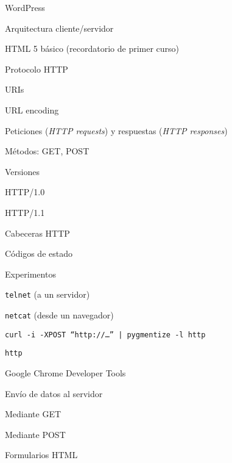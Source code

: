 \begin{longenum}
\begin{longenum}
\begin{longenum}
\begin{longenum}
\begin{longenum}
                    \item WordPress
                \end{longenum}
            \end{longenum}
        \end{longenum}
        \item Arquitectura cliente/servidor
        \item HTML 5 básico (recordatorio de primer curso)
        \item Protocolo HTTP
        \begin{longenum}
            \item URIs
            \begin{longenum}
                \item URL encoding
            \end{longenum}
            \item Peticiones (\textit{HTTP requests}) y respuestas (\textit{HTTP responses})
            \item Métodos: GET, POST
            \item Versiones 
            \begin{longenum}
                \item HTTP/1.0
                \item HTTP/1.1
            \end{longenum}
            \item Cabeceras HTTP
            \item Códigos de estado
            \item Experimentos
            \begin{longenum}
                \item \texttt{telnet} (a un servidor)
                \item \texttt{netcat} (desde un navegador)
                \item \texttt{curl -i -XPOST “http://…” | pygmentize -l http} 
                \item \texttt{http} 
                \item Google Chrome Developer Tools 
            \end{longenum}
            \item Envío de datos al servidor
            \begin{longenum}
                \item Mediante GET
                \item Mediante POST
                \item Formularios HTML

\end{longenum}
\end{longenum}
\end{longenum}
\end{longenum}
